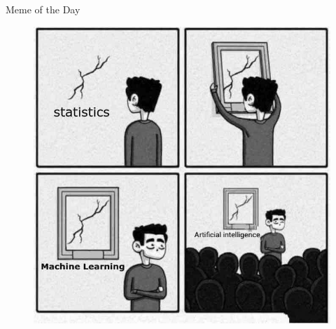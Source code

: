 \begin{frame}{Meme of the Day}{}
	\begin{figure}
		\includegraphics[scale=0.2]{02_math/02_img/meme_of_the_day}
	\end{figure}
\end{frame}


\makethanks

